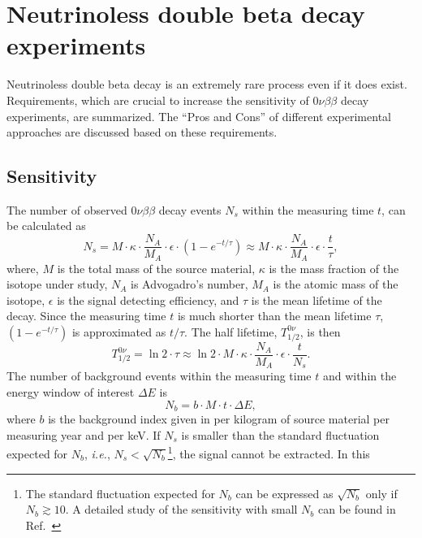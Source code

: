 \chapter{Neutrinoless double beta decay experiments}
\label{cha:exps}
Neutrinoless double beta decay is an extremely rare process even if it
does exist. Requirements, which are crucial to increase the
sensitivity of $0\nu\beta\beta$ decay experiments, are summarized. The
``Pros and Cons'' of different experimental approaches are discussed
based on these requirements.

\section{Sensitivity}
\label{sec:sensi}
The number of observed $0\nu\beta\beta$ decay events $N_{s}$ within
the measuring time $t$, can be calculated as
\begin{equation}
\label{eq:gerda:ns}
N_{s} = M \cdot \kappa \cdot \frac{N_{A}}{M_{A}} \cdot \epsilon 
\cdot (1 - e^{-t/\tau}) \approx M \cdot \kappa \cdot 
\frac{N_{A}}{M_{A}} \cdot \epsilon \cdot \frac{t}{\tau},
\end{equation}
where, $M$ is the total mass of the source material, $\kappa$ is the
mass fraction of the isotope under study, $N_{A}$ is Advogadro's
number, $M_{A}$ is the atomic mass of the isotope, $\epsilon$ is the
signal detecting efficiency, and $\tau$ is the mean lifetime of the
decay. Since the measuring time $t$ is much shorter than the mean
lifetime $\tau$, $(1 - e^{-t/\tau})$ is approximated as $t/\tau$. The
half lifetime, $T^{0\nu}_{1/2}$, is then
\begin{equation}
\label{eq:gerda:thalf}
T^{0\nu}_{1/2} = \ln2 \cdot \tau \approx \ln2 \cdot M \cdot \kappa 
\cdot \frac{N_{A}}{M_{A}} \cdot \epsilon \cdot \frac{t}{N_{s}}.
\end{equation}
The number of background events within the measuring time $t$ and
within the energy window of interest $\Delta E$ is
\begin{equation}
  \label{eq:gerda:nb}
  N_{b} = b \cdot M \cdot t \cdot \Delta E,
\end{equation}
where $b$ is the background index given in per kilogram of source
material per measuring year and per keV. If $N_{s}$ is smaller than
the standard fluctuation expected for $N_{b}$, \textit{i.e.},
$N_{s}<\sqrt{N_{b}}$\footnote{The standard fluctuation expected for
$N_{b}$ can be expressed as $\sqrt{N_{b}}$ only if $N_{b} \gtrsim
10$. A detailed study of the sensitivity with small $N_{b}$ can be
found in Ref.~\cite{Cal06}}, the signal cannot be extracted. In this
